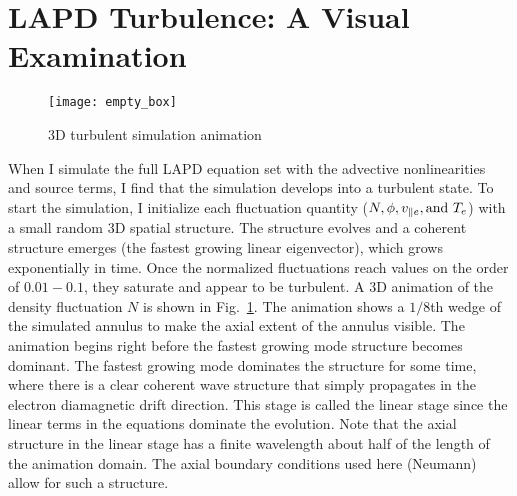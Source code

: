 \section{LAPD Turbulence: A Visual Examination}
\label{s_vis_exam}

\begin{figure}[!ht]
\texttt{[image: empty\_box]}
\centering
\caption{3D turbulent simulation animation}
\label{3D_turb_anim}
\end{figure}


When I simulate the full LAPD equation set with the advective nonlinearities and source terms, I find that the simulation develops into a turbulent state. To start the simulation,
I initialize each fluctuation quantity ($N, \phi, v_{\parallel e}, {\rm and } \ T_e$) with a small random 3D spatial structure. The structure evolves and a coherent structure emerges (the fastest
growing linear eigenvector), which grows exponentially in time. Once the normalized fluctuations reach values on the order of $0.01-0.1$, they saturate and appear to be turbulent.
A 3D animation of the density fluctuation $N$ is shown in Fig.~\ref{3D_turb_anim}. The animation shows a $1/8$th wedge of the simulated annulus to make the axial extent of the annulus visible.
The animation begins right before the fastest growing mode structure becomes dominant. The fastest growing mode dominates the structure for some time, where there is a clear coherent
wave structure that simply propagates in the electron diamagnetic drift direction. This stage is called the linear stage since the linear terms in the equations dominate the evolution.
Note that the axial structure in the linear stage has a finite wavelength about half of the length of the animation domain. The axial boundary conditions used here (Neumann) allow for
such a structure.

